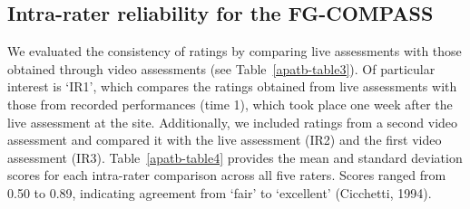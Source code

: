 \documentclass[
  man,
  colorlinks=true,linkcolor=blue,citecolor=blue,urlcolor=blue]{apa7}
\begin{document}
\subsection{Intra-rater reliability for the
FG-COMPASS}\label{intra-rater-reliability-for-the-fg-compass}

We evaluated the consistency of ratings by comparing live assessments
with those obtained through video assessments (see
Table~\ref{apatb-table3}). Of particular interest is `IR1', which
compares the ratings obtained from live assessments with those from
recorded performances (time 1), which took place one week after the live
assessment at the site. Additionally, we included ratings from a second
video assessment and compared it with the live assessment (IR2) and the
first video assessment (IR3). Table~\ref{apatb-table4} provides the mean
and standard deviation scores for each intra-rater comparison across all
five raters. Scores ranged from 0.50 to 0.89, indicating agreement from
`fair' to `excellent' (Cicchetti, 1994).

\newpage{}
\end{document}
